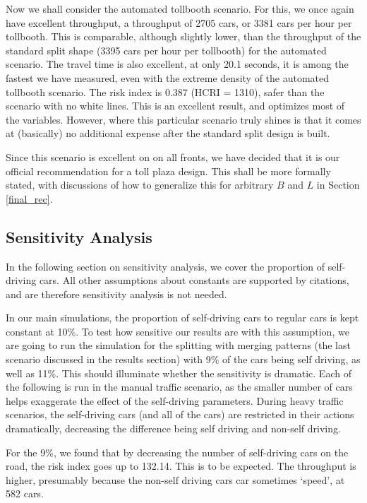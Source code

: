 \documentclass[a4paper, 11pt]{article}
\begin{document}
Now we shall consider the automated tollbooth scenario. For this, we once again have excellent throughput, a throughput of 2705 cars, or 3381 cars per hour per tollbooth. This is comparable, although slightly lower, than the throughput of the standard split shape (3395 cars per hour per tollbooth) for the automated scenario. The travel time is also excellent, at only 20.1 seconds, it is among the fastest we have measured, even with the extreme density of the automated tollbooth scenario. The risk index is 0.387 (HCRI = 1310), safer than the scenario with no white lines. This is an excellent result, and optimizes most of the variables. However, where this particular scenario truly shines is that it comes at (basically) no additional expense after the standard split design is built.  

Since this scenario is excellent on on all fronts, we have decided that it is our official recommendation for a toll plaza design. This shall be more formally stated, with discussions of how to generalize this for arbitrary $B$ and $L$ in Section \ref{final_rec}. 




\subsection{Sensitivity Analysis}

In the following section on sensitivity analysis, we cover the proportion of self-driving cars. All other assumptions about constants are supported by citations, and are therefore sensitivity analysis is not needed. 


In our main simulations, the proportion of self-driving cars to regular cars is kept constant at 10\%.
To test how sensitive our results are with this assumption, we are going to run the simulation for the splitting with merging patterns%
(the last scenario discussed in the results section) with 9\% of the cars being self driving, as well as 11\%. This should illuminate whether the sensitivity is dramatic. Each of the following is run in the manual traffic scenario, as the smaller number of cars helps exaggerate the effect of the self-driving parameters. During heavy traffic scenarios, the self-driving cars (and all of the cars) are restricted in their actions dramatically, decreasing the difference being self driving and non-self driving. 

For the 9\%, we found that by decreasing the number of self-driving cars on the road, the risk index goes up to 132.14. This is to be expected. The throughput is higher, presumably because the non-self driving cars car sometimes `speed', at 582 cars. 
\end{document}
